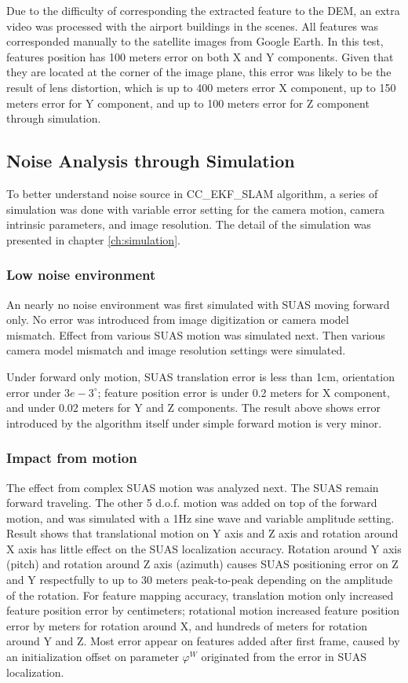 Due to the difficulty of corresponding the extracted feature to the
DEM, an extra video was processed with the airport buildings in the
scenes. All features was corresponded manually to the satellite images
from Google Earth. In this test, features position has 100 meters
error on both X and Y components. Given that they are located at the
corner of the image plane, this error was likely to be the result of
lens distortion, which is up to 400 meters error X component, up to
150 meters error for Y component, and up to 100 meters error for Z
component through simulation.

\subsection{Noise Analysis through Simulation}
To better understand noise source in CC\_EKF\_SLAM algorithm, a series
of simulation was done with variable error setting for the camera
motion, camera intrinsic parameters, and image resolution. The detail
of the simulation was presented in chapter \ref{ch:simulation}.

\subsubsection{Low noise environment}
An nearly no noise environment was first simulated with SUAS moving
forward only. No error was introduced from image digitization or
camera model mismatch. Effect from various SUAS motion was simulated
next. Then various camera model mismatch and image resolution settings
were simulated. 

Under forward only motion, SUAS translation error is
less than 1cm, orientation error under $3e-3^\circ$; feature position
error is under 0.2 meters for X component, and under 0.02 meters for Y
and Z components. The result above shows error introduced by the
algorithm itself under simple forward motion is very minor.

\subsubsection{Impact from motion}
The effect from complex SUAS motion was analyzed next. The SUAS remain
forward traveling. The other 5 d.o.f. motion was added on top of the
forward motion, and was simulated with a 1Hz sine wave and variable
amplitude setting. Result shows that translational motion on Y axis
and Z axis and rotation around X axis has little effect on the SUAS
localization accuracy. Rotation around Y axis (pitch) and rotation
around Z axis (azimuth) causes SUAS positioning error on Z and Y
respectfully to up to 30 meters peak-to-peak depending on the
amplitude of the rotation. For feature mapping accuracy, translation
motion only increased feature position error by centimeters;
rotational motion increased feature position error by meters for
rotation around X, and hundreds of meters for rotation around Y and Z.
Most error appear on features added after first frame, caused by an
initialization offset on parameter $\varphi^W$ originated from the
error in SUAS localization.

